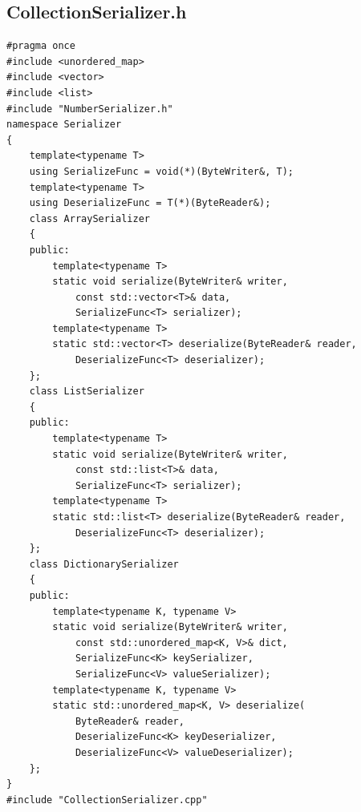 \documentclass[coursework]{SCWorks}
\begin{document}
\subsection{CollectionSerializer.h}
\begin{verbatim}
#pragma once
#include <unordered_map>
#include <vector>
#include <list>
#include "NumberSerializer.h"
namespace Serializer
{
    template<typename T>
    using SerializeFunc = void(*)(ByteWriter&, T);
    template<typename T>
    using DeserializeFunc = T(*)(ByteReader&);
    class ArraySerializer
    {
    public:
        template<typename T>
        static void serialize(ByteWriter& writer,
            const std::vector<T>& data,
            SerializeFunc<T> serializer);
        template<typename T>
        static std::vector<T> deserialize(ByteReader& reader,
            DeserializeFunc<T> deserializer);
    };
    class ListSerializer
    {
    public:
        template<typename T>
        static void serialize(ByteWriter& writer,
            const std::list<T>& data,
            SerializeFunc<T> serializer);
        template<typename T>
        static std::list<T> deserialize(ByteReader& reader,
            DeserializeFunc<T> deserializer);
    };
    class DictionarySerializer
    {
    public:
        template<typename K, typename V>
        static void serialize(ByteWriter& writer,
            const std::unordered_map<K, V>& dict,
            SerializeFunc<K> keySerializer,
            SerializeFunc<V> valueSerializer);
        template<typename K, typename V>
        static std::unordered_map<K, V> deserialize(
            ByteReader& reader,
            DeserializeFunc<K> keyDeserializer,
            DeserializeFunc<V> valueDeserializer);
    };
}
#include "CollectionSerializer.cpp"
\end{verbatim}
\end{document}
